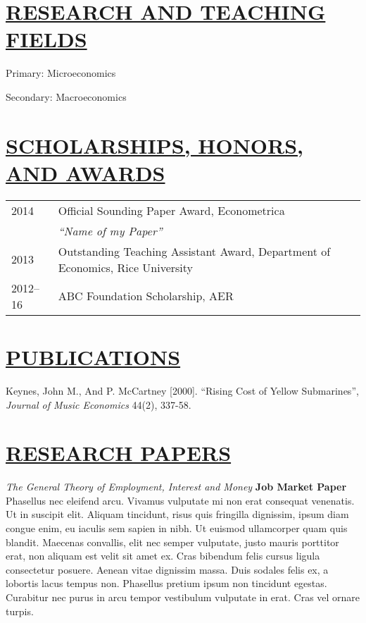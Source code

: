\documentclass{res} %
\begin{document}
\begin{resume}
\vspace{-.2cm}
\section{\scshape \underline{RESEARCH AND TEACHING FIELDS}}
\vspace{6pt} 
\noindent Primary: Microeconomics \par
\noindent Secondary: Macroeconomics

\vspace{-.2cm}
\section{\scshape \underline{SCHOLARSHIPS, HONORS, AND AWARDS}}
\vspace{6pt}
\noindent\begin{tabular}{l l}
 2014 & Official Sounding Paper Award, Econometrica \\
&\hspace{.5cm} \textsl{``Name of my Paper''} \\
 2013 & Outstanding Teaching Assistant Award, Department of Economics, Rice University \\
 2012--16 & ABC Foundation Scholarship, AER
\end{tabular}

\section{\scshape \underline{PUBLICATIONS}} 
\vspace{6pt}%
\noindent Keynes, John M., And P. McCartney [2000]. “Rising Cost of Yellow Submarines”, \emph{Journal of Music Economics} 44(2), 337-58.\par

\vspace{-.2cm}
\section{\scshape \underline{RESEARCH PAPERS}} 
\vspace{6pt}

\noindent \emph{The General Theory of Employment, Interest and Money  }\hfill {\bf Job Market Paper}  \\
Phasellus nec eleifend arcu. Vivamus vulputate mi non erat consequat venenatis. Ut in suscipit elit. Aliquam tincidunt, risus quis fringilla dignissim, ipsum diam congue enim, eu iaculis sem sapien in nibh. Ut euismod ullamcorper quam quis blandit. Maecenas convallis, elit nec semper vulputate, justo mauris porttitor erat, non aliquam est velit sit amet ex. Cras bibendum felis cursus ligula consectetur posuere. Aenean vitae dignissim massa. Duis sodales felis ex, a lobortis lacus tempus non. Phasellus pretium ipsum non tincidunt egestas. Curabitur nec purus in arcu tempor vestibulum vulputate in erat. Cras vel ornare turpis. \par


\end{resume}
\end{document}
